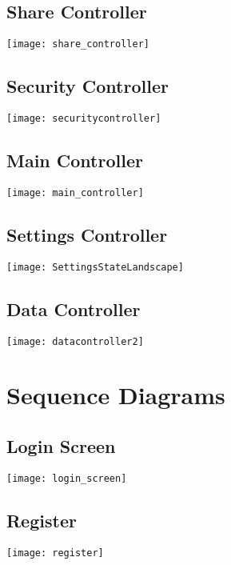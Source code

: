 \documentclass[english]{article}
\begin{document}
\subsection{Share Controller}
\texttt{[image: share\_controller]}

\subsection{Security Controller}
\texttt{[image: securitycontroller]}

\subsection{Main Controller}
\texttt{[image: main\_controller]}

\subsection{Settings Controller}
\texttt{[image: SettingsStateLandscape]}

\subsection{Data Controller}
\texttt{[image: datacontroller2]}


\section{Sequence Diagrams}
\label{sec:sequence_diagrams}

\subsection{Login Screen}
\texttt{[image: login\_screen]}

\subsection{Register}
\texttt{[image: register]}
\end{document}
